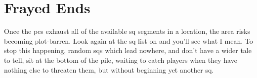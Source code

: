 \section{Frayed Ends}

Once the \glspl{pc} exhaust all of the available \gls{sq} \glspl{segment} in a location, the area risks becoming plot-barren.
Look again at the \gls{sq} list on  and you'll see what I mean.
To stop this happening, random \glspl{sq} which lead nowhere, and don't have a wider tale to tell, sit at the bottom of the pile, waiting to catch players when they have nothing else to threaten them, but without beginning yet another \gls{sq}.
